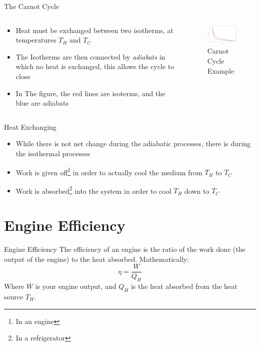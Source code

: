 \documentclass{beamer}
\begin{document}
\begin{frame}{The Carnot Cycle}
    \begin{columns}
    \begin{column}{0.5\textwidth}
      \begin{itemize}
      \item Heat must be exchanged between two isotherms, at temperatures $T_H$ and $T_C$
      \item The Isotherms are then connected by \textit{adiabats} in which no heat is exchanged, this allows the cycle to close
      \item In The figure, the red lines are isoterms, and the blue are adiabats
      \end{itemize}
    \end{column}
    \begin{column}{0.5\textwidth}
      \begin{figure}[H]
        \centering
        \includegraphics[width=5.0cm]{carnotcycle.png}
        \caption{Carnot Cycle Example}
      \end{figure}
    \end{column}
  \end{columns}  
\end{frame}

\begin{frame}{Heat Exchanging}
  \begin{itemize}
  \item While there is not net change during the adiabatic processes, there is during the isothermal processes
  \item Work is given off\footnote{In an engine} in order to actually cool the medium from $T_H$ to $T_C$
  \item Work is absorbed\footnote{In a refrigerator} into the system in order to cool $T_H$ down to $T_C$
  \end{itemize}
\end{frame}

\section{Engine Efficiency}
\begin{frame}{Engine Efficiency}
  The efficiency of an engine is the ratio of the work done (the output of the engine) to the heat absorbed. Mathematically:
  \begin{equation}
    \eta=\frac{W}{Q_H}
  \end{equation}
  Where $W$ is your engine output, and $Q_H$ is the heat absorbed from the heat source $T_H$.
\end{frame}
\end{document}
